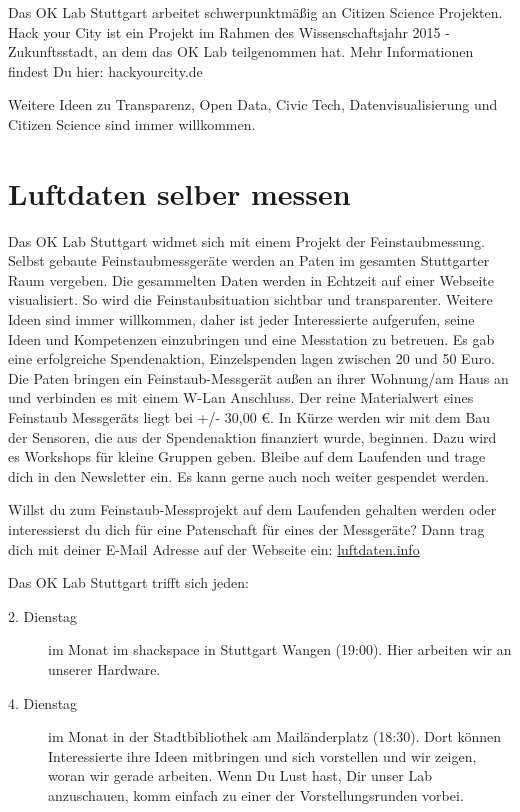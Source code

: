 \documentclass[
notumble,
]{leaflet}
\begin{document}
Das OK Lab Stuttgart arbeitet schwerpunktmäßig an Citizen Science Projekten. 
Hack your City ist ein Projekt im Rahmen des Wissenschaftsjahr 2015 - Zukunftsstadt, an dem das OK Lab teilgenommen hat. 
Mehr Informationen findest Du hier: hackyourcity.de

Weitere Ideen zu Transparenz, Open Data, Civic Tech, Datenvisualisierung und Citizen Science sind immer willkommen.



\section{Luftdaten selber messen}

Das OK Lab Stuttgart widmet sich mit einem Projekt der Feinstaubmessung. 
Selbst gebaute Feinstaubmessgeräte werden an Paten im gesamten Stuttgarter Raum vergeben. 
Die gesammelten Daten werden in Echtzeit auf einer Webseite visualisiert. 
So wird die Feinstaubsituation sichtbar und transparenter. 
Weitere Ideen sind immer willkommen, daher ist jeder Interessierte aufgerufen, seine Ideen und Kompetenzen einzubringen und eine Messtation zu betreuen.
Es gab eine erfolgreiche Spendenaktion, Einzelspenden lagen zwischen 20 und 50 Euro.
Die Paten bringen ein Feinstaub-Messgerät außen an ihrer Wohnung/am Haus an und verbinden es mit einem W-Lan Anschluss.
Der reine Materialwert eines Feinstaub Messgeräts liegt bei +/- 30,00 €. 
% 
In Kürze werden wir mit dem Bau der Sensoren, die aus der Spendenaktion finanziert wurde, beginnen. 
Dazu wird es Workshops für kleine Gruppen geben. Bleibe auf dem Laufenden und trage dich in den Newsletter ein.
Es kann gerne auch noch weiter gespendet werden.

Willst du zum Feinstaub-Messprojekt auf dem Laufenden gehalten werden oder interessierst du dich für eine Patenschaft für eines der Messgeräte?
Dann trag dich mit deiner E-Mail Adresse auf der Webseite ein:
\href{http://luftdaten.info/}{luftdaten.info}

Das OK Lab Stuttgart trifft sich jeden:
\begin{description}
 \item [2. Dienstag] im Monat im shackspace in Stuttgart Wangen (19:00). Hier arbeiten wir an unserer Hardware.
 \item [4. Dienstag] im Monat in der Stadtbibliothek am Mailänderplatz (18:30). 
	Dort können Interessierte ihre Ideen mitbringen und sich vorstellen und wir zeigen, woran wir gerade arbeiten. 
	Wenn Du Lust hast, Dir unser Lab anzuschauen, komm einfach zu einer der Vorstellungsrunden vorbei.
\end{description}
\end{document}
